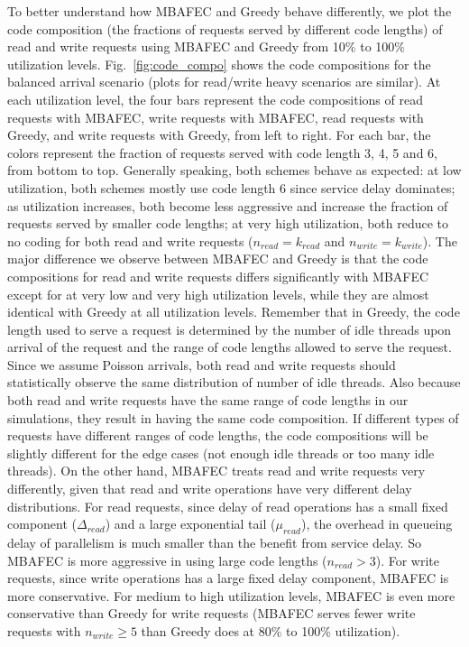 \documentclass[journal]{IEEEtran}
\newcommand{\multiclass}{{MBAFEC}\xspace}
\begin{document}
To better understand how \multiclass and Greedy behave differently, we plot the code composition (the fractions of requests served by different code lengths) of read and write requests using \multiclass and Greedy from 10\% to 100\% utilization levels. Fig.~\ref{fig:code_compo} shows the code compositions for the balanced arrival scenario (plots for read/write heavy scenarios are similar). At each utilization level, the four bars represent the code compositions of read requests with \multiclass, write requests with \multiclass, read requests with Greedy, and write requests with Greedy, from left to right. For each bar, the colors represent the fraction of requests served with code length 3, 4, 5 and 6, from bottom to top. Generally speaking, both schemes behave as expected: at low utilization, both schemes mostly use code length 6 since service delay dominates;  as utilization increases, both become less aggressive and increase the fraction of requests served by smaller code lengths; at very high utilization, both reduce to no coding for both read and write requests ($n_{read}=k_{read}$ and $n_{write}=k_{write}$). The major difference we observe between \multiclass and Greedy is that the code compositions for read and write requests differs significantly with \multiclass except for at very low and very high utilization levels, while they are almost identical with Greedy at all utilization levels. Remember that in Greedy, the code length used to serve a request is determined by the number of idle threads upon arrival of the request and the range of code lengths allowed to serve the request. Since we assume Poisson arrivals, both read and write requests should statistically observe the same distribution of number of idle threads. Also because both read and write requests have the same range of code lengths in our simulations, they result in having the same code composition. If different types of requests have different ranges of code lengths, the code compositions will be slightly different for the edge cases (not enough idle threads or too many idle threads). On the other hand, \multiclass treats read and write requests very differently, given that read and write operations have very different delay distributions. For read requests, since delay of read operations has a small fixed component ($\Delta_{read}$) and a large exponential tail ($\mu_{read}$), the overhead in queueing delay of parallelism is much smaller than the benefit from service delay. So \multiclass is more aggressive in using large code lengths ($n_{read} > 3$). For write requests, since write operations has a large fixed delay component, \multiclass is more conservative. For medium to high utilization levels, \multiclass is even more conservative than Greedy for write requests (\multiclass serves fewer write requests with $n_{write}\ge 5$ than Greedy does at 80\% to 100\% utilization). 
\end{document}
